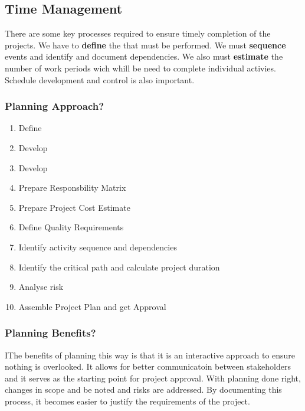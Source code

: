 \documentclass[english, 11pt]{article}
\begin{document}
      \subsection{Time Management}
        There are some key processes required to ensure timely completion of the projects. We have to {\bf define} the  that must be performed. We must {\bf sequence} events and identify and document dependencies. We also must {\bf estimate} the number of work periods wich whill be need to complete individual activies. Schedule development and control is also important.

      \subsubsection{Planning Approach?}
        \begin{enumerate}
          \item Define 
          \item Develop 
          \item Develop 
          \item Prepare Responsbility Matrix
          \item Prepare Project Cost Estimate
          \item Define Quality Requirements
          \item Identify activity sequence and dependencies
          \item Identify the critical path and calculate project duration
          \item Analyse risk
          \item Assemble Project Plan and get Approval
        \end{enumerate}

      \subsubsection{Planning Benefits?}
        IThe benefits of planning this way is that it is an interactive approach to ensure nothing is overlooked. It allows for better communicatoin between stakeholders and it serves as the starting point for project approval. With planning done right, changes in scope and be noted and risks are addressed. By documenting this process, it becomes easier to justify the requirements of the project. \\
\end{document}
